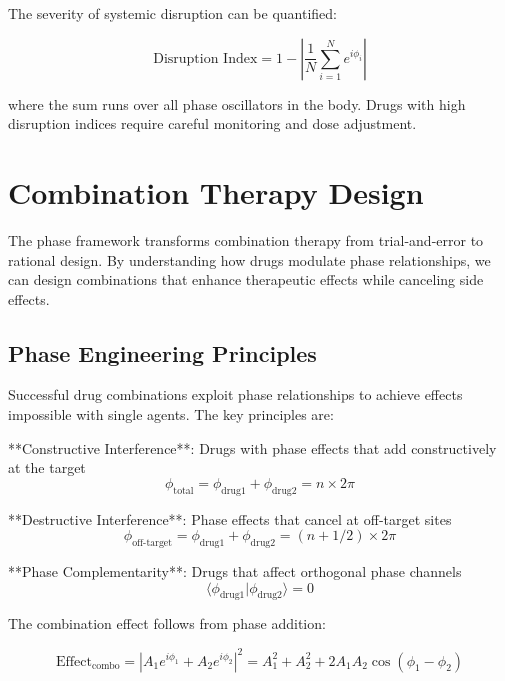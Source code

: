 \documentclass[12pt,a4paper]{report}
\begin{document}
The severity of systemic disruption can be quantified:

\begin{equation}
\text{Disruption Index} = 1 - \left|\frac{1}{N} \sum_{i=1}^{N} e^{i\phi_i}\right|
\end{equation}

where the sum runs over all phase oscillators in the body. Drugs with high disruption indices require careful monitoring and dose adjustment.

\section{Combination Therapy Design}

The phase framework transforms combination therapy from trial-and-error to rational design. By understanding how drugs modulate phase relationships, we can design combinations that enhance therapeutic effects while canceling side effects.

\subsection{Phase Engineering Principles}

Successful drug combinations exploit phase relationships to achieve effects impossible with single agents. The key principles are:

**Constructive Interference**: Drugs with phase effects that add constructively at the target
\begin{equation}
\phi_{\text{total}} = \phi_{\text{drug1}} + \phi_{\text{drug2}} = n \times 2\pi
\end{equation}

**Destructive Interference**: Phase effects that cancel at off-target sites
\begin{equation}
\phi_{\text{off-target}} = \phi_{\text{drug1}} + \phi_{\text{drug2}} = (n + 1/2) \times 2\pi
\end{equation}

**Phase Complementarity**: Drugs that affect orthogonal phase channels
\begin{equation}
\langle \phi_{\text{drug1}} | \phi_{\text{drug2}} \rangle = 0
\end{equation}

The combination effect follows from phase addition:

\begin{equation}
\text{Effect}_{\text{combo}} = |A_1 e^{i\phi_1} + A_2 e^{i\phi_2}|^2 = A_1^2 + A_2^2 + 2A_1 A_2 \cos(\phi_1 - \phi_2)
\end{equation}
\end{document}
